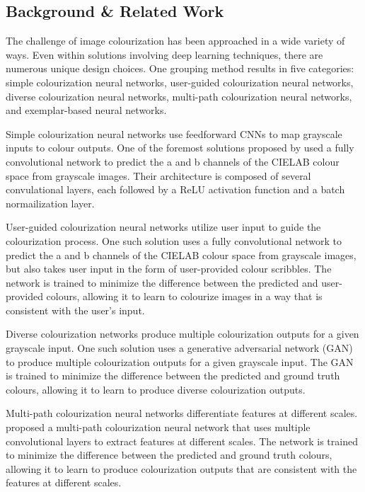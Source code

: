 \documentclass{article} %
\begin{document}
\subsection{Background \& Related Work}

The challenge of image colourization has been approached in a wide variety of ways. Even within solutions involving deep learning
techniques, there are numerous unique design choices. One grouping method \cite{zeger2021grayscale} results in five categories: simple colourization neural networks,
user-guided colourization neural networks, diverse colourization neural networks, multi-path colourization neural networks, and exemplar-based
neural networks. 

Simple colourization neural networks use feedforward CNNs to map grayscale inputs to colour outputs. One of the foremost solutions proposed by 
\cite{zhang2016colorful} used a fully convolutional network to predict the a and b channels of the CIELAB colour space from grayscale images. Their 
architecture is composed of several convulational layers, each followed by a ReLU activation function and a batch normailization layer.

User-guided colourization neural networks utilize user input to guide the colourization process. One such solution \cite{zhang2017real} uses a
fully convolutional network to predict the a and b channels of the CIELAB colour space from grayscale images, but also takes user input in the form of
user-provided colour scribbles. The network is trained to minimize the difference between the predicted and user-provided colours, allowing it to
learn to colourize images in a way that is consistent with the user's input. 

Diverse colourization networks produce multiple colourization outputs for a given grayscale input. One such solution \cite{Vitoria2020ChromaGAN} uses
a generative adversarial network (GAN) to produce multiple colourization outputs for a given grayscale input. The GAN is trained to minimize the difference
between the predicted and ground truth colours, allowing it to learn to produce diverse colourization outputs. 

Multi-path colourization neural networks differentiate features at different scales. \cite{Iizuka2016Colourization} proposed a multi-path
colourization neural network that uses multiple convolutional layers to extract features at different scales. The network is trained to minimize the difference
between the predicted and ground truth colours, allowing it to learn to produce colourization outputs that are consistent with the features at different scales. 
\end{document}
